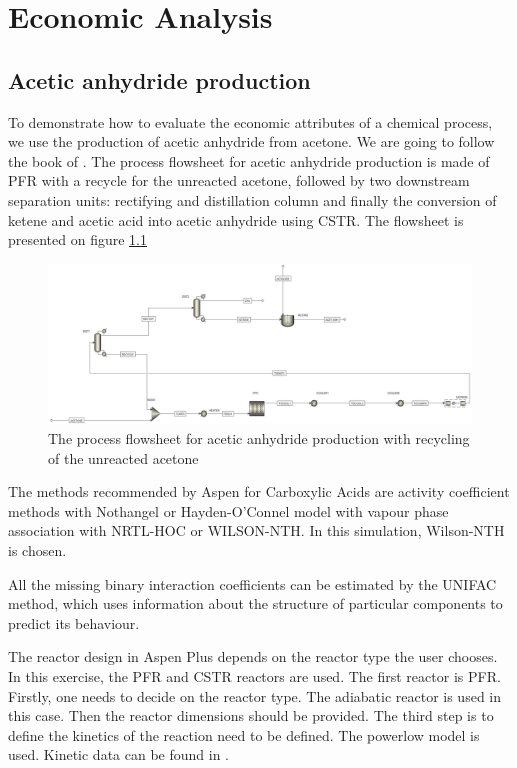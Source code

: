 \chapter{Economic Analysis}

\section{Acetic anhydride production}

	To demonstrate how to evaluate the economic attributes of a chemical process, we use the production of acetic anhydride from acetone. We are going to follow the book of \cite{AlMalah2016}. The process flowsheet for acetic anhydride production is made of PFR with a recycle for the unreacted acetone, followed by two downstream separation units: rectifying and distillation column and finally the conversion of ketene and acetic acid into acetic anhydride using CSTR. The flowsheet is presented on figure \ref{fig:Acetic_Flowsheet}
	
	\begin{figure}[h!]
		\centering
		\includegraphics[trim= 0cm 0cm 0cm 0cm,clip,width=\textwidth]{Figures/Econmic_Analysis/Flowsheet.jpg}
		\caption{The process flowsheet for acetic anhydride production with recycling of the unreacted acetone}
		\label{fig:Acetic_Flowsheet}
	\end{figure}

	The methods recommended by Aspen for Carboxylic Acids are activity coefficient methods with Nothangel or Hayden-O'Connel model with vapour phase association with NRTL-HOC or WILSON-NTH. In this simulation, Wilson-NTH is chosen. 
	
	All the missing binary interaction coefficients can be estimated by the UNIFAC method, which uses information about the structure of particular components to predict its behaviour. 
	
	The reactor design in Aspen Plus depends on the reactor type the user chooses. In this exercise, the PFR and CSTR reactors are used. The first reactor is PFR. Firstly, one needs to decide on the reactor type. The adiabatic reactor is used in this case. Then the reactor dimensions should be provided. The third step is to define the kinetics of the reaction need to be defined. The powerlow model is used. Kinetic data can be found in \cite{Fogler1974}. 
	
